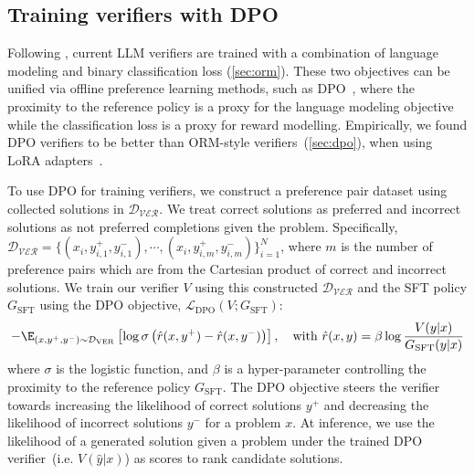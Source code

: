 \subsection{Training verifiers with DPO}
\label{sec:dpo_verifier}

Following \citet{DBLP:journals/corr/abs-2110-14168},
current LLM verifiers are trained with a combination of language modeling and binary classification loss (\autoref{sec:orm}). These two objectives can be unified via offline preference learning methods, such as DPO~\citep{rafailov2023direct}, where the proximity to the reference policy is a proxy for the language modeling objective while the classification loss is a proxy for reward modelling. Empirically, we found DPO verifiers to be better than ORM-style verifiers~(\autoref{sec:dpo}), when using LoRA adapters~\citep{DBLP:conf/iclr/HuSWALWWC22}.

To use DPO for training verifiers, we construct a preference pair dataset using collected solutions in $\mathcal{D_\text{VER}}$. We treat correct solutions as preferred and incorrect solutions as not preferred completions given the problem.
Specifically, $\mathcal{D_\text{VER}} = \{(x_i,y_{i,1}^{+}, y_{i,1}^{-}), \cdots ,(x_i,y_{i,m}^{+}, y_{i,m}^{-})\}_{i=1}^{N}$, where $m$ is the number of preference pairs which are from the Cartesian product of correct and incorrect solutions.
We train our verifier $V$ using this constructed $\mathcal{D_\text{VER}}$ and the SFT policy $G_{\text{SFT}}$ using the DPO objective, $\mathcal{L}_{\text{DPO}}(V; G_{\text{SFT}})$: 
\begin{align}
    - \E_{(x, y^+, y^-) \sim \mathcal{D}_{\text{VER}}} \left[ \log \sigma \left( \hat{r}(x,y^+) -  \hat{r}(x,y^-) \right) \right], \quad \mathrm{with}\  \hat{r}(x,y) = \beta \log \frac{V (y | x)}{G_{\text{SFT}}(y | x)} \label{eq:dpo}
\end{align}
where $\sigma$ is the logistic function, and $\beta$ is a hyper-parameter controlling the proximity to the reference policy $G_{\text{SFT}}$.
The DPO objective steers the verifier towards increasing the likelihood of correct solutions $y^+$ and decreasing the likelihood of incorrect solutions $y^-$ for a problem $x$.
At inference, we use the likelihood of a generated solution given a problem under the trained DPO verifier~(i.e. $V(\hat{y} | x)$) as scores to rank candidate solutions. 




